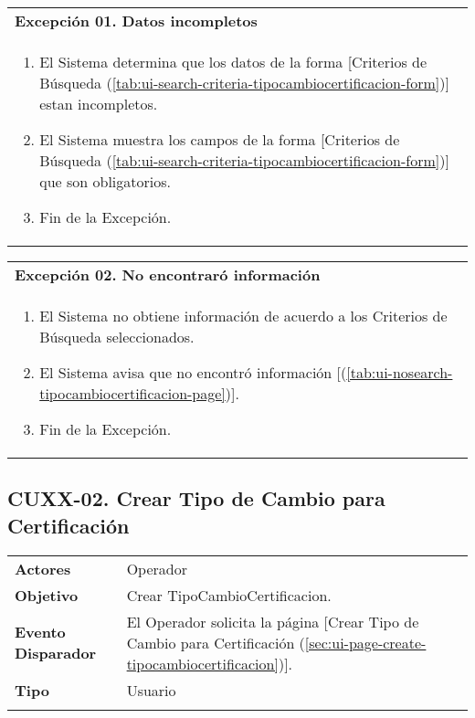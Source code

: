 \begin{tabular}{ p{15.5cm} }
	\textbf{Excepción 01. Datos incompletos} \\
	\begin{enumerate}
		\item El Sistema determina que los datos de la forma [Criterios de Búsqueda (\ref{tab:ui-search-criteria-tipocambiocertificacion-form})] estan incompletos.
		\item El Sistema muestra los campos de la forma [Criterios de Búsqueda (\ref{tab:ui-search-criteria-tipocambiocertificacion-form})] que son obligatorios.
		\item Fin de la Excepción.
	\end{enumerate}
\end{tabular}

\begin{tabular}{ p{15.5cm} }
	\textbf{Excepción 02. No encontraró información} \\
	\begin{enumerate}
		\item El Sistema no obtiene información de acuerdo a los Criterios de Búsqueda seleccionados.
		\item El Sistema avisa que no encontró información [(\ref{tab:ui-nosearch-tipocambiocertificacion-page})].
		\item Fin de la Excepción.
	\end{enumerate}
\end{tabular}


\clearpage
\subsection{CUXX-02. Crear Tipo de Cambio para Certificación} \label{sec:cu-create-TipoCambioCertificacion}

\begin{tabular}{ p{3.5cm} p{11.5cm} }
	\textbf{Actores} & Operador\\
	\textbf{Objetivo} & Crear TipoCambioCertificacion.\\
	\textbf{Evento Disparador} & El Operador solicita la página [Crear Tipo de Cambio para Certificación (\ref{sec:ui-page-create-tipocambiocertificacion})].\\
	\textbf{Tipo} & Usuario\\
	\\
\end{tabular}

